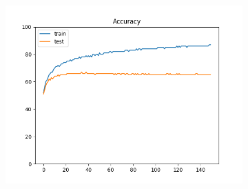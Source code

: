 \documentclass[12pt]{article}
\begin{document}
\begin{figure}
\begin{subfigure}{0.19\textwidth}
    \includegraphics[width=\linewidth]{accuracies_3_e150.png}
  \end{subfigure}


\end{figure}
\end{document}
